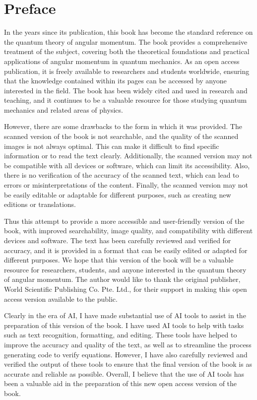 \section*{Preface}
In the years since its publication, this book has become the standard reference on the quantum theory of angular momentum.  The book provides a comprehensive treatment of the subject, covering both the theoretical foundations and practical applications of angular momentum in quantum mechanics. As an open access publication, it is freely available to researchers and students worldwide, ensuring that the knowledge contained within its pages can be accessed by anyone interested in the field. The book has been widely cited and used in research and teaching, and it continues to be a valuable resource for those studying quantum mechanics and related areas of physics.

However, there are some drawbacks to the form in which it was provided. The scanned version of the book is not searchable, and the quality of the scanned images is not always optimal. This can make it difficult to find specific information or to read the text clearly. Additionally, the scanned version may not be compatible with all devices or software, which can limit its accessibility. Also, there is no verification of the accuracy of the scanned text, which can lead to errors or misinterpretations of the content. Finally, the scanned version may not be easily editable or adaptable for different purposes, such as creating new editions or translations.

Thus this attempt to provide a more accessible and user-friendly version of the book, with improved searchability, image quality, and compatibility with different devices and software. The text has been carefully reviewed and verified for accuracy, and it is provided in a format that can be easily edited or adapted for different purposes. We hope that this version of the book will be a valuable resource for researchers, students, and anyone interested in the quantum theory of angular momentum. The author would like to thank the original publisher, World Scientific Publishing Co. Pte. Ltd., for their support in making this open access version available to the public.

Clearly in  the era of AI, I have made substantial use of AI tools to assist in the preparation of this version of the book. I have used AI tools to help with tasks such as text recognition, formatting, and editing. These tools have helped to improve the accuracy and quality of the text, as well as to streamline the process generating code to verify equations. However, I have also carefully reviewed and verified the output of these tools to ensure that the final version of the book is as accurate and reliable as possible. Overall, I believe that the use of AI tools has been a valuable aid in the preparation of this new open access version of the book.

